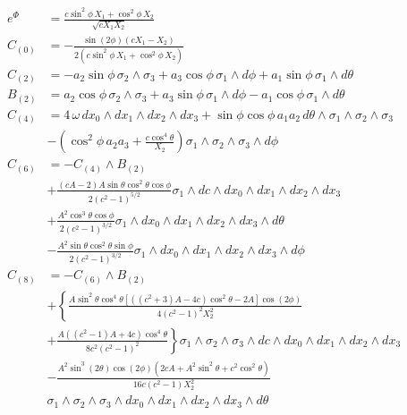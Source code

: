 

\begin{align*}
e^{\Phi} & =
\frac{c \sin^2\phi \, X_1+\cos^2\phi \,X_2}{\sqrt{c X_1 X_2}}\\
%
C_{(0)} & = 
-\frac{\sin(2 \phi ) (c X_1-X_2)}{2  (c \sin^2\phi \, X_1+\cos^2\phi \,X_2)}\\
%
C_{(2)} & = 
- a_2 \sin\phi \,
\sigma_2\wedge \sigma_3
+ a_3 \cos\phi \,
\sigma_1\wedge d\phi
+ a_1 \sin\phi \,
\sigma_1\wedge d\theta\\
% 
B_{(2)} & =
a_2 \cos\phi \,
\sigma_2\wedge \sigma_3
+ a_3 \sin\phi \,
\sigma_1\wedge d\phi
- a_1 \cos\phi \,
\sigma_1\wedge d\theta\\
% 
C_{(4)} & =
4 \, \omega \,
dx_0\wedge dx_1\wedge dx_2\wedge dx_3 
+ \sin\phi \cos\phi \, a_1 a_2 \,
d\theta\wedge \sigma_1\wedge \sigma_2\wedge \sigma_3\\
&
-\left(\cos ^2\phi \, a_2 a_3 +\frac{c \cos^4\theta}{X_2}\right) 
\sigma_1\wedge \sigma_2\wedge \sigma_3 \wedge d\phi \\
% 
C_{(6)} &= - C_{(4)} \wedge B_{(2)}\\
&+\frac{(c A-2) A \sin\theta \cos^2\theta \cos\phi}{2 \left(c^2-1\right)^{5/2}} 
\sigma_1\wedge dc\wedge dx_0\wedge dx_1\wedge dx_2\wedge dx_3\\
&
+\frac{A^2 \cos^3\theta \cos\phi}{2 (c^2-1)^{3/2}}
\sigma_1\wedge dx_0 \wedge dx_1\wedge dx_2\wedge dx_3\wedge d\theta\\
&
-\frac{A^2 \sin\theta \cos^2\theta \sin\phi}{2 (c^2-1)^{3/2}}
\sigma_1\wedge dx_0 \wedge dx_1\wedge dx_2\wedge dx_3\wedge d\phi \\
%
C_{(8)} &= - C_{(6)} \wedge B_{(2)}\\
&+ \left\{ \frac{A \sin^2\theta \cos^4\theta \left[ ((c^2+3) A-4 c) \cos^2\theta-2 A \right]\cos(2\phi)}{4 (c^2-1)^2 X_2^2} \right.\\
&+ \left.\frac{A ((c^2-1) A + 4 c) \cos^4\theta}{8 c^2 (c^2-1)^2} \right\}
\sigma_1 \wedge \sigma_2\wedge \sigma_3\wedge dc\wedge dx_0\wedge dx_1\wedge dx_2\wedge dx_3\\
& -\frac{A^2 \sin^3(2 \theta ) \cos(2 \phi ) \left(2 c A + A^2 \sin^2\theta +c^2 \cos^2\theta\right)}{16 c (c^2-1) X_2^2}\\
&\sigma_1\wedge \sigma_2\wedge \sigma_3\wedge dx_0\wedge dx_1\wedge dx_2\wedge dx_3\wedge d\theta
\end{align*}

